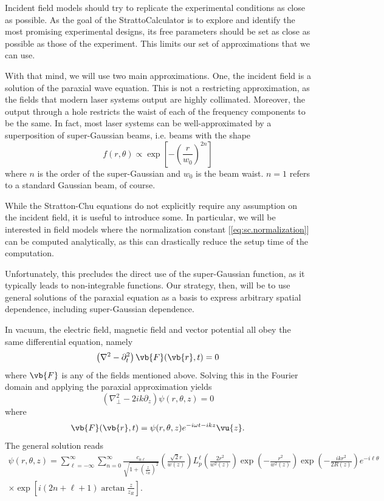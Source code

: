 \documentclass[11pt,SymmetricalJury]{inrsthesis/inrsthesis}
\begin{document}
Incident field models should try to replicate the experimental conditions
as close as possible. As the goal of the StrattoCalculator is to explore
and identify the most promising experimental designs, its free parameters
should be set as close as possible as those of the experiment. This limits
our set of approximations that we can use.

With that mind, we will use two main approximations. One, the incident field
is a solution of the paraxial wave equation. This is not a restricting approximation,
as the fields that modern laser systems output are highly collimated. Moreover,
the output through a hole restricts the waist of each of the frequency components
to be the same. In fact, most laser systems can be well-approximated by a
superposition of super-Gaussian beams, i.e. beams with the shape
  \begin{equation}
    f(r,\theta) \propto \exp\left[-\left(\frac{r}{w_0}\right)^{2n}\right]
  \end{equation}
where $n$ is the order of the super-Gaussian and $w_0$ is the beam waist.
$n=1$ refers to a standard Gaussian beam, of course.

While the Stratton-Chu equations do not explicitly require any assumption on
the incident field, it is useful to introduce some. In particular, we will be
interested in field models where the normalization constant [\eqref{eq:sc.normalization}]
can be computed analytically, as this can drastically reduce the setup time
of the computation. 

Unfortunately, this precludes the direct use of the super-Gaussian function,
as it typically leads to non-integrable functions. Our strategy, then, will
be to use general solutions of the paraxial equation as a basis to express
arbitrary spatial dependence, including super-Gaussian dependence.

In vacuum, the electric field, magnetic field and vector potential all obey
the same differential equation, namely
  \begin{equation}
    \left(\nabla^2-\partial_t^2\right)\vb{F}(\vb{r},t) = 0
  \end{equation}
where $\vb{F}$ is any of the fields mentioned above. Solving this
in the Fourier domain and applying the paraxial approximation
yields
  \begin{equation}
    \left(\nabla_\perp^2-2ik\partial_z\right)\psi(r,\theta,z) = 0
  \end{equation}
where
  \begin{equation}
    \vb{F}(\vb{r},t) = \psi(r,\theta,z)e^{-i\omega t - ikz} \vu{z}.
  \end{equation}
The general solution reads \cite{Allen1992}
  \begin{multline}
    \psi(r,\theta,z) = \sum_{\ell=-\infty}^\infty\sum_{n=0}^\infty
      \frac{c_{n\ell}}{\sqrt{1+\left(\frac{z}{z_R}\right)^2}}
      \left(\frac{\sqrt{2}r}{w(z)}\right)
      L_p^\ell\left(\frac{2r^2}{w^2(z)}\right)\exp\left(-\frac{r^2}{w^2(z)}\right)
      \exp\left(-\frac{ikr^2}{2R(z)}\right)e^{-i\ell\theta}\\
      \times\exp\left[i\left(2n+\ell+1\right)\arctan\frac{z}{z_R}\right].
  \end{multline}
\end{document}
